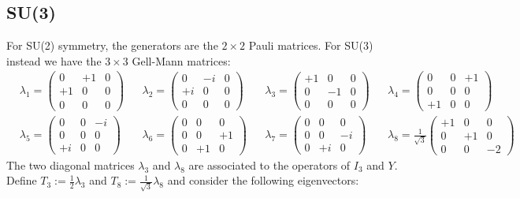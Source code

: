 \documentclass[10.75pt,a4paper,openright,bottom=2cm]{article}
\begin{document}
\subsection{SU(3)}
For SU(2) symmetry, the generators are the $2\times2$ Pauli matrices. For SU(3) instead we have the $3\times3$ Gell-Mann matrices:
\[
\begin{aligned}
&\lambda_1 = \begin{pmatrix} 0 & +1 & 0 \\ +1 & 0 & 0 \\ 0 & 0 & 0 \end{pmatrix} &&\lambda_2 = \begin{pmatrix} 0 & -i & 0 \\ +i & 0 & 0 \\ 0 & 0 & 0 \end{pmatrix} &&\lambda_3 = \begin{pmatrix} +1 & 0 & 0 \\ 0 & -1 & 0 \\ 0 & 0 & 0 \end{pmatrix} &&\lambda_4 = \begin{pmatrix} 0 & 0 & +1 \\ 0 & 0 & 0 \\ +1 & 0 & 0 \end{pmatrix} \\
&\lambda_5 = \begin{pmatrix} 0 & 0 & -i \\ 0 & 0 & 0 \\ +i & 0 & 0 \end{pmatrix} &&\lambda_6 = \begin{pmatrix} 0 & 0 & 0 \\ 0 & 0 & +1 \\ 0 & +1 & 0 \end{pmatrix} &&\lambda_7 = \begin{pmatrix} 0 & 0 & 0 \\ 0 & 0 & -i \\ 0 & +i & 0 \end{pmatrix} &&\lambda_8 = \frac{1}{\sqrt{3}} \begin{pmatrix} +1 & 0 & 0 \\ 0 & +1 & 0 \\ 0 & 0 & -2 \end{pmatrix}
\end{aligned}
\]
The two diagonal matrices $\lambda_3$ and $\lambda_8$ are associated to the operators of $I_3$ and $Y$. Define $T_3:=\frac{1}{2}\lambda_3$ and $T_8:=\frac{1}{\sqrt{3}}\lambda_8$ and consider the following eigenvectors:
\end{document}
